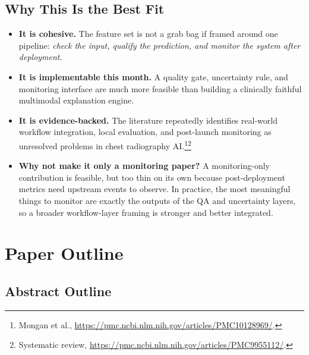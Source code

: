 \documentclass[11pt]{article}
\begin{document}
\subsection{Why This Is the Best Fit}

\begin{itemize}[leftmargin=1.5em]
    \item \textbf{It is cohesive.} The feature set is not a grab bag if framed around one pipeline: \emph{check the input, qualify the prediction, and monitor the system after deployment.}
    \item \textbf{It is implementable this month.} A quality gate, uncertainty rule, and monitoring interface are much more feasible than building a clinically faithful multimodal explanation engine.
    \item \textbf{It is evidence-backed.} The literature repeatedly identifies real-world workflow integration, local evaluation, and post-launch monitoring as unresolved problems in chest radiography AI.\footnote{Mongan et al., \url{https://pmc.ncbi.nlm.nih.gov/articles/PMC10128969/}.}\footnote{Systematic review, \url{https://pmc.ncbi.nlm.nih.gov/articles/PMC9955112/}.}
    \item \textbf{Why not make it only a monitoring paper?} A monitoring-only contribution is feasible, but too thin on its own because post-deployment metrics need upstream events to observe. In practice, the most meaningful things to monitor are exactly the outputs of the QA and uncertainty layers, so a broader workflow-layer framing is stronger and better integrated.
\end{itemize}

\section{Paper Outline}

\subsection{Abstract Outline}
\end{document}
